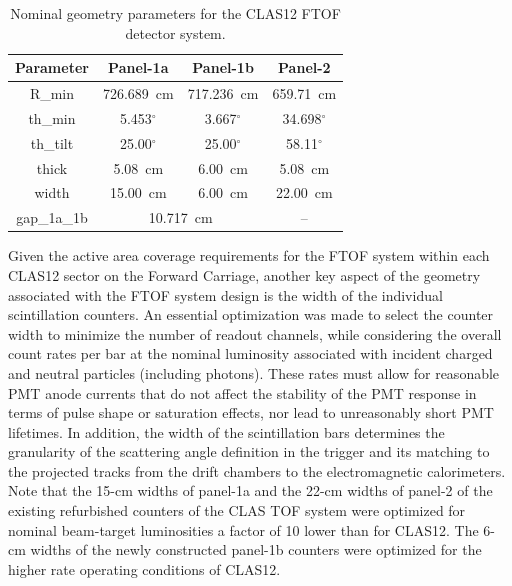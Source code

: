 \documentclass[3p,times,twocolumn]{elsarticle}
\begin{document}
\begin{table}[htbp]
\begin{center}
\begin{tabular} {c|c|c|c} \hline
Parameter & Panel-1a &  Panel-1b & Panel-2 \\ \hline
R\_min      & 726.689~cm & 717.236~cm & 659.71~cm \\
th\_min    & 5.453$^\circ$ & 3.667$^\circ$ & 34.698$^\circ$ \\
th\_tilt    & 25.00$^\circ$ & 25.00$^\circ$ & 58.11$^\circ$ \\
thick        & 5.08~cm           & 6.00~cm         & 5.08~cm \\ 
width       & 15.00~cm         & 6.00~cm         & 22.00~cm \\
gap\_1a\_1b & \multicolumn{2}{c|}{10.717~cm} &  -- \\ \hline
\end{tabular}
\caption{Nominal geometry parameters for the CLAS12 FTOF detector system.}
\label{geom-parms}
\end{center}
\end{table}

Given the active area coverage requirements for the FTOF system within each CLAS12 sector on the
Forward Carriage, another key aspect of the geometry associated with the FTOF system design is
the width of the individual scintillation counters. An essential optimization was made to select the
counter width to minimize the number of readout channels, while considering the overall count rates per
bar at the nominal luminosity associated with incident charged and neutral particles (including photons).
These rates must allow for reasonable PMT anode currents that do not affect the stability of the PMT
response in terms of pulse shape or saturation effects, nor lead to unreasonably short PMT lifetimes.
In addition, the width of the scintillation bars determines the granularity of the scattering angle definition
in the trigger and its matching to the projected tracks from the drift chambers to the electromagnetic
calorimeters. Note that the 15-cm widths of panel-1a and the 22-cm widths of panel-2 of the existing
refurbished counters of the CLAS TOF system were optimized for nominal beam-target luminosities a
factor of 10 lower than for CLAS12. The 6-cm widths of the newly constructed panel-1b counters were
optimized for the higher rate operating conditions of CLAS12.
\end{document}
